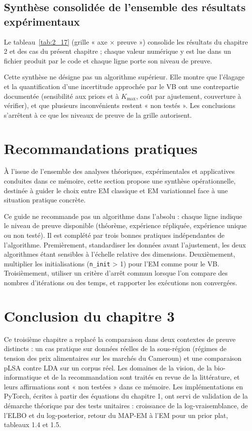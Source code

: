 \subsection{Synthèse consolidée de l'ensemble des résultats expérimentaux}
Le tableau~\ref{tab:2_17} (grille « axe $\times$ preuve ») consolide les résultats du chapitre 2 et des cas du présent chapitre ; chaque valeur numérique y est lue dans un fichier produit par le code et chaque ligne porte son niveau de preuve.

Cette synthèse ne désigne pas un algorithme supérieur. Elle montre que l'élagage et la quantification d'une incertitude approchée par le VB ont une contrepartie documentée (sensibilité aux priors et à $K_{\max}$, coût par ajustement, couverture à vérifier), et que plusieurs inconvénients restent « non testés ». Les conclusions s'arrêtent à ce que les niveaux de preuve de la grille autorisent.

\section{Recommandations pratiques}
À l'issue de l'ensemble des analyses théoriques, expérimentales et applicatives conduites dans ce mémoire, cette section propose une synthèse opérationnelle, destinée à guider le choix entre EM classique et EM variationnel face à une situation pratique concrète.

Ce guide ne recommande pas un algorithme dans l'absolu : chaque ligne indique le niveau de preuve disponible (théorème, expérience répliquée, expérience unique ou non testé). Il est complété par trois bonnes pratiques indépendantes de l'algorithme. Premièrement, standardiser les données avant l'ajustement, les deux algorithmes étant sensibles à l'échelle relative des dimensions. Deuxièmement, multiplier les initialisations (\texttt{n\_init} > 1) pour l'EM comme pour le VB. Troisièmement, utiliser un critère d'arrêt commun lorsque l'on compare des nombres d'itérations ou des temps, et rapporter les exécutions non convergées.

\section{Conclusion du chapitre 3}
Ce troisième chapitre a replacé la comparaison dans deux contextes de preuve distincts : un cas pratique sur données réelles de la sous-région (régimes de tension des prix alimentaires sur les marchés du Cameroun) et une comparaison pLSA contre LDA sur un corpus réel. Les domaines de la vision, de la bio-informatique et de la recommandation sont traités en revue de la littérature, et leurs affirmations sont « non testées » dans ce mémoire. Les implémentations en PyTorch, écrites à partir des équations du chapitre 1, ont servi de validation de la démarche théorique par des tests unitaires : croissance de la log-vraisemblance, de l'ELBO et du log-posterior, retour du MAP-EM à l'EM pour un prior plat, tableaux 1.4 et 1.5.

